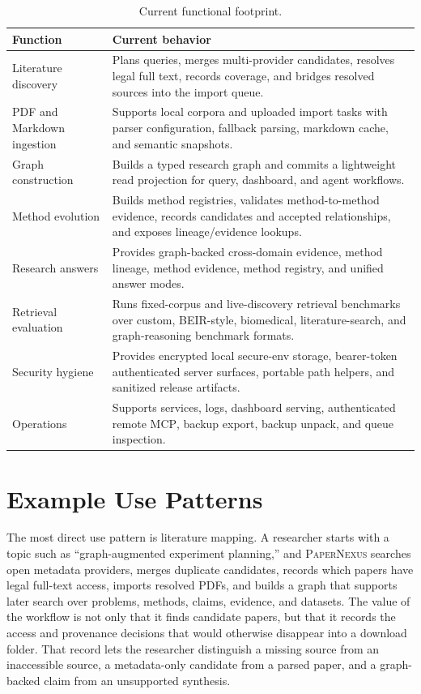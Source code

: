 \documentclass[11pt]{article}
\newcommand{\papernexus}{\textsc{PaperNexus}}
\newcommand{\mcp}{\textsc{MCP}}
\begin{document}
\begin{table}[t]
\centering
\caption{Current functional footprint.}
\label{tab:footprint}
\begin{tabularx}{\linewidth}{@{}lY@{}}
\toprule
Function & Current behavior \\
\midrule
Literature discovery & Plans queries, merges multi-provider candidates, resolves legal full text, records coverage, and bridges resolved sources into the import queue. \\
PDF and Markdown ingestion & Supports local corpora and uploaded import tasks with parser configuration, fallback parsing, markdown cache, and semantic snapshots. \\
Graph construction & Builds a typed research graph and commits a lightweight read projection for query, dashboard, and agent workflows. \\
Method evolution & Builds method registries, validates method-to-method evidence, records candidates and accepted relationships, and exposes lineage/evidence lookups. \\
Research answers & Provides graph-backed cross-domain evidence, method lineage, method evidence, method registry, and unified answer modes. \\
Retrieval evaluation & Runs fixed-corpus and live-discovery retrieval benchmarks over custom, BEIR-style, biomedical, literature-search, and graph-reasoning benchmark formats. \\
Security hygiene & Provides encrypted local secure-env storage, bearer-token authenticated server surfaces, portable path helpers, and sanitized release artifacts. \\
Operations & Supports services, logs, dashboard serving, authenticated remote \mcp{}, backup export, backup unpack, and queue inspection. \\
\bottomrule
\end{tabularx}
\end{table}

\section{Example Use Patterns}

The most direct use pattern is literature mapping. A researcher starts with a topic such as ``graph-augmented experiment planning,'' and \papernexus{} searches open metadata providers, merges duplicate candidates, records which papers have legal full-text access, imports resolved PDFs, and builds a graph that supports later search over problems, methods, claims, evidence, and datasets. The value of the workflow is not only that it finds candidate papers, but that it records the access and provenance decisions that would otherwise disappear into a download folder. That record lets the researcher distinguish a missing source from an inaccessible source, a metadata-only candidate from a parsed paper, and a graph-backed claim from an unsupported synthesis.
\end{document}
